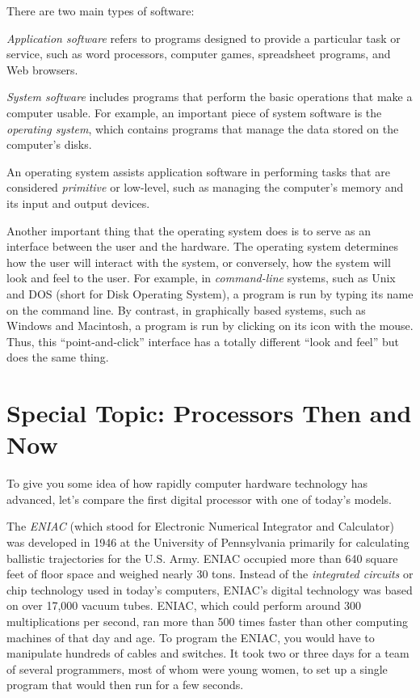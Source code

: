 \vspace{7pt}\noindent There are two main types of software:

\vspace{7pt}
\begin{BL}
\item  {\it Application software} refers to programs designed
to provide a particular task or service, such as word processors,
computer games, spreadsheet programs, and Web browsers.

\vspace{5pt}\item  {\it System software} includes programs that perform the
basic operations that make a computer usable.  For example, an
important piece of system software is the {\it operating system},
which contains programs that manage the data stored on the computer's
disks. 
\end{BL}

An operating system assists application software in performing tasks
that are considered {\em primitive} or low-level, such as managing the
computer's memory and its input and output devices.

Another important thing that the operating system does is to serve as
an interface between the user and the hardware.  The operating system
determines how the user will interact with the system, or conversely,
how the system will look and feel to the user.  For example, in {\it
command-line} systems, such as Unix and DOS (short for Disk Operating
System), a program is run by typing its name on the command line.  By
contrast, in graphically based systems, such as Windows and Macintosh,
a program is run by clicking on its icon with the mouse.  Thus, this
``point-and-click'' interface has a totally different ``look and
feel'' but does the same thing.

\section*{{\color{cyan}Special Topic:} Processors Then and Now} 

{\color{cyan}To give} you some idea of how rapidly computer hardware technology
has advanced, let's compare the first digital processor with one of
today's models.

The {\it ENIAC} (which stood for Electronic Numerical 
Integrator and Calculator) was developed in 1946 at the University of
Pennsylvania primarily for calculating ballistic trajectories for the
U.S. Army.  ENIAC occupied more than 640 square feet of floor space
and weighed nearly 30 tons.  Instead of the {\it integrated circuits}
or chip technology used in today's computers, ENIAC's digital
technology was based on over 17,000 vacuum tubes.  ENIAC, which could
perform around 300 multiplications per second, ran more than 500 times
faster than other computing machines of that day and age.  To program
the ENIAC, you would have to manipulate hundreds of cables and
switches.  It took two or three days for a team of several
programmers, most of whom were young women, to set up a single program
that would then run for a few seconds.


